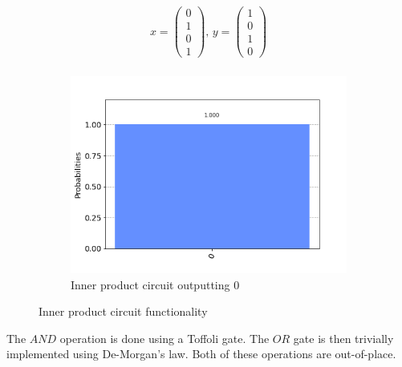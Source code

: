 \documentclass[10pt]{proc}
\theoremstyle{definition}
\theoremstyle{remark}
\begin{document}
\begin{figure}[!ht]
  \begin{minipage}[b]{0.45\textwidth}
    \begin{align*}
      x = \begin{pmatrix}0\\1\\0\\1\end{pmatrix} \text{, } y = \begin{pmatrix}1\\0\\1\\0\end{pmatrix} \\
    \end{align*}
  \end{minipage}
  \begin{subfigure}[b]{0.3\textwidth}
    \includegraphics[width=\textwidth]{results/inner_product_false.png} 
    \caption{Inner product circuit outputting $0$}
    \label{fig:inner_product_example_false}
  \end{subfigure}

\caption{Inner product circuit functionality}
\label{fig:inner_product_func}
\end{figure}

The $AND$ operation is done using a Toffoli gate.  The $OR$ gate is then
trivially implemented using De-Morgan's law. Both of these operations are
out-of-place.
\end{document}
